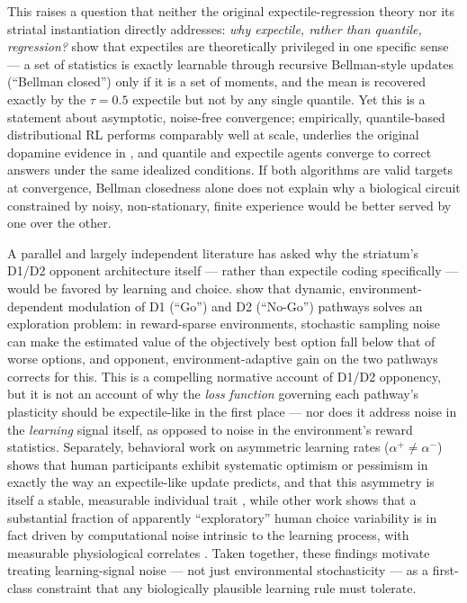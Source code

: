 \documentclass[11pt]{article}
\begin{document}
This raises a question that neither the original expectile-regression theory nor its striatal instantiation directly addresses: \emph{why expectile, rather than quantile, regression?} \citet{rowland2019} show that expectiles are theoretically privileged in one specific sense --- a set of statistics is exactly learnable through recursive Bellman-style updates (``Bellman closed'') only if it is a set of moments, and the mean is recovered exactly by the $\tau=0.5$ expectile but not by any single quantile. Yet this is a statement about asymptotic, noise-free convergence; empirically, quantile-based distributional RL performs comparably well at scale, underlies the original dopamine evidence in \citet{dabney2020}, and quantile and expectile agents converge to correct answers under the same idealized conditions. If both algorithms are valid targets at convergence, Bellman closedness alone does not explain why a biological circuit constrained by noisy, non-stationary, finite experience would be better served by one over the other.

A parallel and largely independent literature has asked why the striatum's D1/D2 opponent architecture itself --- rather than expectile coding specifically --- would be favored by learning and choice. \citet{jaskirfrank2023} show that dynamic, environment-dependent modulation of D1 (``Go'') and D2 (``No-Go'') pathways solves an exploration problem: in reward-sparse environments, stochastic sampling noise can make the estimated value of the objectively best option fall below that of worse options, and opponent, environment-adaptive gain on the two pathways corrects for this. This is a compelling normative account of D1/D2 opponency, but it is not an account of why the \emph{loss function} governing each pathway's plasticity should be expectile-like in the first place --- nor does it address noise in the \emph{learning} signal itself, as opposed to noise in the environment's reward statistics. Separately, behavioral work on asymmetric learning rates ($\alpha^+ \ne \alpha^-$) shows that human participants exhibit systematic optimism or pessimism in exactly the way an expectile-like update predicts, and that this asymmetry is itself a stable, measurable individual trait \citep{lefebvre2017}, while other work shows that a substantial fraction of apparently ``exploratory'' human choice variability is in fact driven by computational noise intrinsic to the learning process, with measurable physiological correlates \citep{findling2019}. Taken together, these findings motivate treating learning-signal noise --- not just environmental stochasticity --- as a first-class constraint that any biologically plausible learning rule must tolerate.
\end{document}
